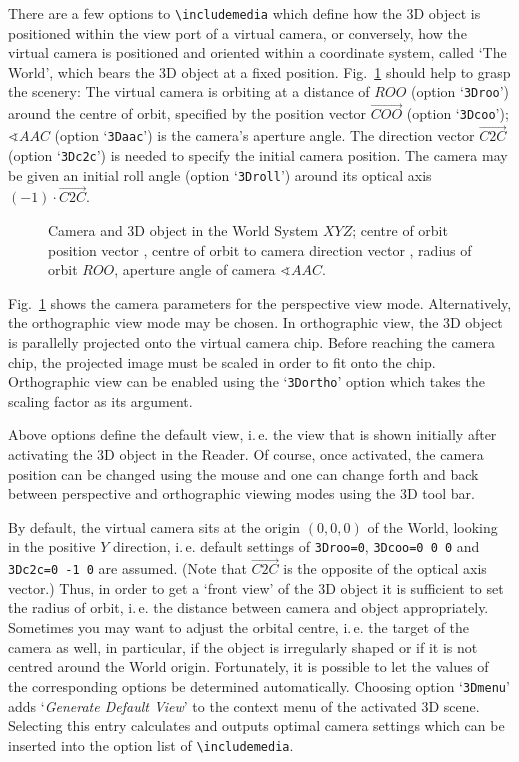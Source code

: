 \documentclass[a4paper]{article}
\begin{document}
There are a few options to \verb+\includemedia+ which define how the 3D object is positioned within the view port of a virtual camera, or conversely, how the virtual camera is positioned and oriented within a coordinate system, called `The World', which bears the 3D object at a fixed position. Fig.~\ref{3dscene} should help to grasp the scenery: The virtual camera is orbiting at a distance of $ROO$ (option `\verb+3Droo+') around the centre of orbit, specified by the position vector $\overrightarrow{COO}$ (option `\verb+3Dcoo+'); $\sphericalangle AAC$ (option `\verb+3Daac+') is the camera's aperture angle. The direction vector $\overrightarrow{C2C}$ (option `\verb+3Dc2c+') is needed to specify the initial camera position. The camera may be given an initial roll angle (option `\verb+3Droll+') around its optical axis $(-1)\cdot\overrightarrow{C2C}$.
\begin{figure}[ht]
  \resizebox{\linewidth}{!}{}
  \caption{Camera and 3D object in the World System $XYZ$; centre of orbit position vector \usebox{\COO}, centre of orbit to camera direction vector \usebox{\CtoC}, radius of orbit $ROO$, aperture angle of camera $\sphericalangle AAC$.}\label{3dscene}
\end{figure}
Fig.~\ref{3dscene} shows the camera parameters for the perspective view mode. Alternatively, the orthographic view mode may be chosen. In orthographic view, the 3D object is parallelly projected onto the virtual camera chip. Before reaching the camera chip, the projected image must be scaled in order to fit onto the chip. Orthographic view can be enabled using the `\verb+3Dortho+' option which takes the scaling factor as its argument.

Above options define the default view, i.\,e. the view that is shown initially after activating the 3D object in the Reader. Of course, once activated, the camera position can be changed using the mouse and one can change forth and back between perspective and orthographic viewing modes using the 3D tool bar.

By default, the virtual camera sits at the origin $(0,0,0)$ of the World, looking in the positive $Y$ direction, i.\,e. default settings of \verb+3Droo=0+, \verb+3Dcoo=0 0 0+ and \verb+3Dc2c=0 -1 0+ are assumed. (Note that $\overrightarrow{C2C}$ is the opposite of the optical axis vector.) Thus, in order to get a `front view' of the 3D object it is sufficient to set the radius of orbit, i.\,e. the distance between camera and object appropriately. Sometimes you may want to adjust the orbital centre, i.\,e. the target of the camera as well, in particular, if the object is irregularly shaped or if it is not centred around the World origin. Fortunately, it is possible to let the values of the corresponding options be determined automatically. Choosing option `\verb+3Dmenu+' adds `\emph{\sffamily Generate Default View}' to the context menu of the activated 3D scene. Selecting this entry calculates and outputs optimal camera settings which can be inserted into the option list of \verb+\includemedia+.
\end{document}
